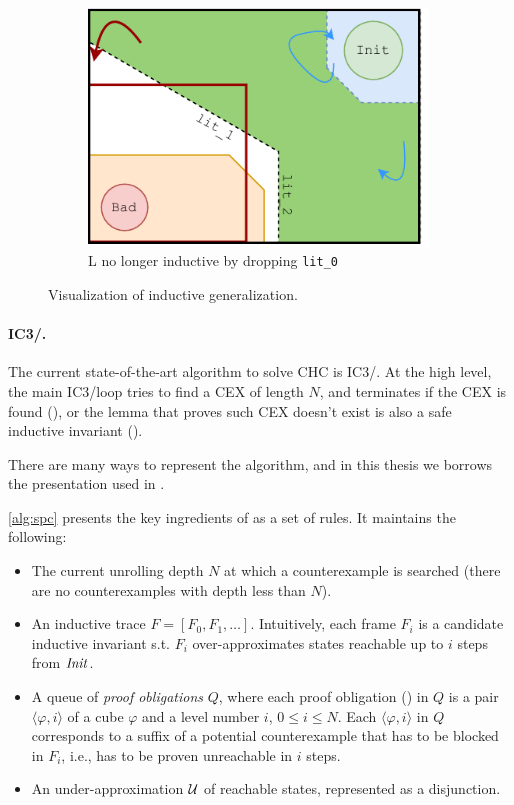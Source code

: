 \begin{figure}[t]
\begin{subfigure}[b]{0.3\textwidth}
    \includegraphics[width=0.99\textwidth]{figures/doping-lemma_not_ind.pdf}
    \caption{L no longer inductive by dropping \texttt{lit\_0}}
    \label{fig:not_ind_gen}
	\end{subfigure}

  \caption{Visualization of inductive generalization.}
  \label{fig:vis_ind_gen}
\end{figure}




\paragraph{IC3/\spc.}
The current state-of-the-art algorithm to solve CHC is IC3/\spc \cite{spacer}.
At the high level, the main IC3/\spc loop tries to find a CEX of length $N$,
and terminates if the CEX is found (\unsafe), or the lemma that proves such CEX
doesn't exist is also a safe inductive invariant (\safe). 

There are many ways to represent the \spc algorithm, and in this thesis we borrows
the presentation used in \cite{GSpacer}.

\cref{alg:spc} presents the key ingredients of \spc as a set of rules. It
maintains the following:
\begin{itemize}
  \item The current unrolling depth $N$ at
    which a counterexample is searched (there are no counterexamples with depth less
    than $N$).
  \item An inductive trace $F = [F_0, F_1, \ldots]$.
    Intuitively, each frame $F_i$ is a candidate inductive invariant s.t.
    $F_i$ over-approximates states reachable up to $i$ steps from $\mathit{Init}$.

  \item A queue of \emph{proof obligations} $Q$, where each proof obligation
    (\pob) in $Q$ is a pair $\langle \varphi, i \rangle$ of a cube $\varphi$ and a
    level number $i$, $0 \leq i \leq N$.
    Each \pob $\langle \varphi, i \rangle$ in $Q$ corresponds to a suffix of a potential
    counterexample that has to be blocked in $F_i$, i.e., has to be proven unreachable in $i$ steps.
  \item An under-approximation $\mathcal{U}$ of reachable
    states, represented as a disjunction.
\end{itemize}

